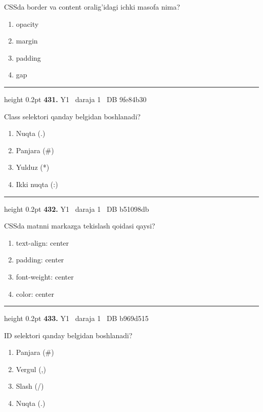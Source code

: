 \documentclass[10pt,a4paper,oneside]{article}
\begin{document}
\par
CSSda border va content oralig'idagi ichki masofa nima?
\begin{enumerate}[label=\Alph*),leftmargin=9mm]
\item opacity
\item margin
\item padding
\item gap
\end{enumerate}
\vspace{2mm}\hrule height 0.2pt \vspace{4mm}
\hypertarget{q431}{\textbf{\color{ink}431.}}  {\color{muted}\scriptsize Y1 \textbullet\ daraja 1 \textbullet\ DB 9fe84b30}
\par
Class selektori qanday belgidan boshlanadi?
\begin{enumerate}[label=\Alph*),leftmargin=9mm]
\item Nuqta (.)
\item Panjara (\#)
\item Yulduz (*)
\item Ikki nuqta (:)
\end{enumerate}
\vspace{2mm}\hrule height 0.2pt \vspace{4mm}
\hypertarget{q432}{\textbf{\color{ink}432.}}  {\color{muted}\scriptsize Y1 \textbullet\ daraja 1 \textbullet\ DB b51098db}
\par
CSSda matnni markazga tekislash qoidasi qaysi?
\begin{enumerate}[label=\Alph*),leftmargin=9mm]
\item text-align: center
\item padding: center
\item font-weight: center
\item color: center
\end{enumerate}
\vspace{2mm}\hrule height 0.2pt \vspace{4mm}
\hypertarget{q433}{\textbf{\color{ink}433.}}  {\color{muted}\scriptsize Y1 \textbullet\ daraja 1 \textbullet\ DB b969d515}
\par
ID selektori qanday belgidan boshlanadi?
\begin{enumerate}[label=\Alph*),leftmargin=9mm]
\item Panjara (\#)
\item Vergul (,)
\item Slash (/)
\item Nuqta (.)
\end{enumerate}
\end{document}
